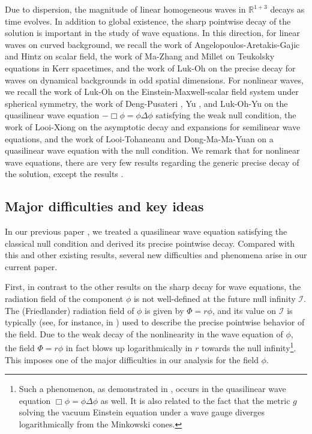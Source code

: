 \documentclass[a4paper,reqno]{amsart}
\theoremstyle{definition}
\numberwithin{equation}{section}
\begin{document}
Due to dispersion, the magnitude of linear homogeneous waves in $\mathbb{R}^{1+3}$ decays as time evolves. In addition to global existence, the sharp pointwise decay of the solution is important in the study of wave equations. In this direction, for linear waves on curved background, we recall the work of Angelopoulos-Aretakis-Gajic \cite{angelopoulos2021late} and Hintz \cite{Hintz} on scalar field, the work of Ma-Zhang \cite{MZ21PLKerr} and Millet \cite{Millet23} on Teukolsky equations in Kerr spacetimes, and the work of Luk-Oh \cite{LuOh} on the precise decay for waves on dynamical backgrounds in odd spatial dimensions.  For nonlinear waves, we recall the work of Luk-Oh \cite{LuOh19} on the Einstein-Maxwell-scalar field system under spherical symmetry, the work of Deng-Pusateri \cite{DengPusateri2020}, Yu \cite{Yu21, Yu24, Yu}, and Luk-Oh-Yu \cite{LuOhYu} on the quasilinear wave equation $-\Box \phi = \phi \Delta \phi$ satisfying the weak null condition, the work of Looi-Xiong \cite{LX25} on the asymptotic decay and expansions for semilinear wave equations, and the work of Looi-Tohaneanu \cite{Looi2022Nullcondition} and Dong-Ma-Ma-Yuan \cite{DMMY} on a quasilinear wave equation with the null condition. We remark that for nonlinear wave equations, there are very few results regarding the generic precise decay of the solution, except the results \cite{LuOh19, DMMY, LuOhYu}.


\subsection{Major difficulties and key ideas} 
 
In our previous paper \cite{DMMY}, we treated a quasilinear wave equation satisfying the classical null condition and derived its precise pointwise decay. Compared with this and other existing results, several new difficulties and phenomena arise in our current paper. 

First, in contrast to the other results on the sharp decay for wave equations, the radiation field of the component $\phi$ is not well-defined at the future null infinity $\mathcal{I}$. The (Friedlander) radiation field of $\phi$ is given by $\Phi = r\phi$, and its value on $\mathcal{I}$ is typically (see, for instance, in \cite{LuOh, DMMY}) used to describe the precise pointwise behavior of the field. Due to the weak decay of the nonlinearity in the wave equation of $\phi$, the field $\Phi=r\phi$ in fact blows up logarithmically in $r$ towards the null infinity\footnote{Such a phenomenon, as demonstrated in \cite{DengPusateri2020,Yu24,Yu}, occurs in the quasilinear wave equation $\Box\phi=\phi\Delta \phi$ as well. It is also related to the fact \cite{YCB73,LindbladRodnianski2010} that the metric $g$ solving the vacuum Einstein equation under a wave gauge diverges logarithmically from the Minkowski cones.}. This imposes one of the major difficulties in our analysis for the field $\phi$. 
\end{document}

